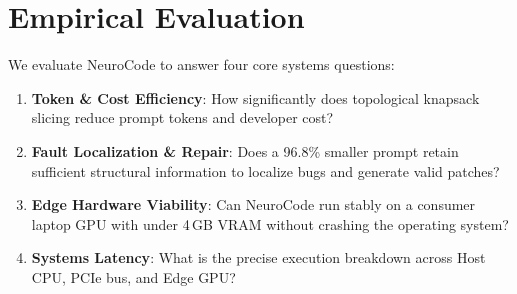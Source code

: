\documentclass{article}
\begin{document}
\begin{table}[t]
\centering
\small
\caption{\textbf{Comprehensive Empirical Evaluation on SWE-bench Lite ($N = 292$ Verified Instances).} NeuroCode slashes prompt token footprint by 97.1\% and cuts developer API costs by 97.1\% while delivering a 5.5$\times$ improvement in fault localization Recall@3 over lexical and PageRank baselines.}
\label{tab:swebench}
\end{table}

\section{Empirical Evaluation}
\label{sec:eval}

We evaluate NeuroCode to answer four core systems questions:
\begin{enumerate}
    \item \textbf{Token \& Cost Efficiency}: How significantly does topological knapsack slicing reduce prompt tokens and developer cost?
    \item \textbf{Fault Localization \& Repair}: Does a 96.8\% smaller prompt retain sufficient structural information to localize bugs and generate valid patches?
    \item \textbf{Edge Hardware Viability}: Can NeuroCode run stably on a consumer laptop GPU with under 4\,GB VRAM without crashing the operating system?
    \item \textbf{Systems Latency}: What is the precise execution breakdown across Host CPU, PCIe bus, and Edge GPU?
\end{enumerate}
\end{document}
